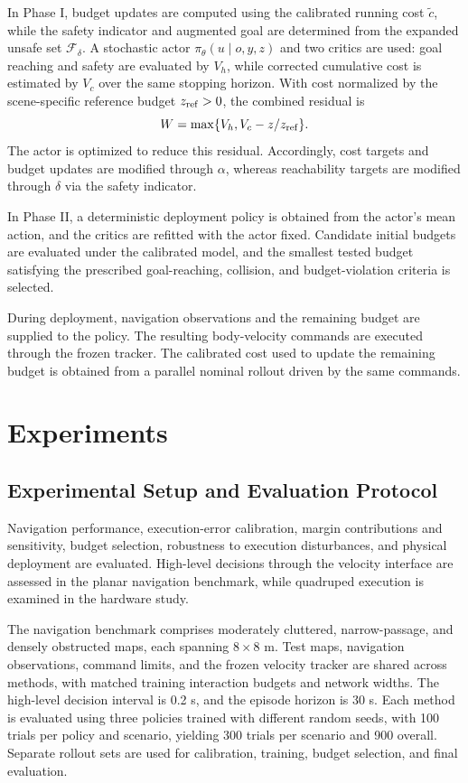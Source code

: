 \documentclass[conference]{IEEEtran}
\begin{document}
In Phase I, budget updates are computed using the calibrated running cost $\tilde c$,
while the safety indicator and augmented goal are determined from the expanded
unsafe set $\mathcal{F}_\delta$. A stochastic actor
$\pi_\theta(u\mid o,y,z)$ and two critics are used: goal reaching and safety
are evaluated by $V_h$, while corrected cumulative cost is estimated by $V_c$
over the same stopping horizon. With
cost normalized by the scene-specific reference budget $z_{\rm ref}>0$, the combined residual is
\begin{equation}
W=\max\{V_h,V_c-z/z_{\rm ref}\}.
\label{eq:combined_residual}
\end{equation}
The actor is optimized to reduce this residual. Accordingly, cost targets and
budget updates are modified through $\alpha$, whereas reachability targets are
modified through $\delta$ via the safety indicator.

In Phase II, a deterministic deployment policy is obtained from the actor's mean
action, and the critics are refitted with the actor fixed. Candidate initial
budgets are evaluated under the calibrated model, and the smallest tested budget
satisfying the prescribed goal-reaching, collision, and budget-violation criteria
is selected.

During deployment, navigation observations and the remaining budget are supplied
to the policy. The resulting body-velocity commands are executed through the
frozen tracker. The calibrated cost used to update the remaining budget is
obtained from a parallel nominal rollout driven by the same commands.

\section{Experiments}
\subsection{Experimental Setup and Evaluation Protocol}
\label{sec:experimental_setup}
Navigation performance, execution-error calibration, margin contributions and
sensitivity, budget selection, robustness to execution disturbances, and physical
deployment are evaluated. High-level decisions through the velocity interface are
assessed in the planar navigation benchmark, while quadruped execution is examined
in the hardware study.

The navigation benchmark comprises moderately cluttered, narrow-passage, and
densely obstructed maps, each spanning $8\times8$ m. Test maps, navigation
observations, command limits, and the frozen velocity tracker are shared across
methods, with matched training interaction budgets and network widths. The high-level decision
interval is 0.2 s, and the episode horizon is 30 s. Each method is evaluated using three policies trained with different random
seeds, with 100 trials per policy and scenario, yielding 300 trials per scenario
and 900 overall. Separate rollout
sets are used for calibration, training, budget selection, and final evaluation.
\end{document}
